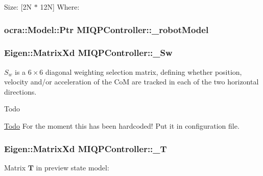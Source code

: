 \-Size\-: \mbox{[}2\-N $\ast$ 12\-N\mbox{]} \-Where\-: \[ \] \hypertarget{classMIQPController_a03735ecec3242cdfc9bf8a443c561724}{
\subsubsection[{\-\_\-robot\-Model}]{\setlength{\rightskip}{0pt plus 5cm}ocra\-::\-Model\-::\-Ptr {\bf \-M\-I\-Q\-P\-Controller\-::\-\_\-robot\-Model}}}\label{classMIQPController_a03735ecec3242cdfc9bf8a443c561724}
\hypertarget{classMIQPController_ada92fc35065a11b889019f2948c1888d}{
\subsubsection[{\-\_\-\-Sw}]{\setlength{\rightskip}{0pt plus 5cm}\-Eigen\-::\-Matrix\-Xd {\bf \-M\-I\-Q\-P\-Controller\-::\-\_\-\-Sw}}}\label{classMIQPController_ada92fc35065a11b889019f2948c1888d}
$S_w$ is a $6\times6$ diagonal weighting selection matrix, defining whether position, velocity and/or acceleration of the \-Co\-M are tracked in each of the two horizontal directions.

\begin{DoxyRefDesc}{\-Todo}
\item[\hyperlink{todo__todo000008}{\-Todo}]\-For the moment this has been hardcoded! \-Put it in configuration file. \end{DoxyRefDesc}
\hypertarget{classMIQPController_a1143455ae85d0e221578dbe5d659af1d}{
\subsubsection[{\-\_\-\-T}]{\setlength{\rightskip}{0pt plus 5cm}\-Eigen\-::\-Matrix\-Xd {\bf \-M\-I\-Q\-P\-Controller\-::\-\_\-\-T}}}\label{classMIQPController_a1143455ae85d0e221578dbe5d659af1d}
\-Matrix $\mathbf{T}$ in preview state model\-:

